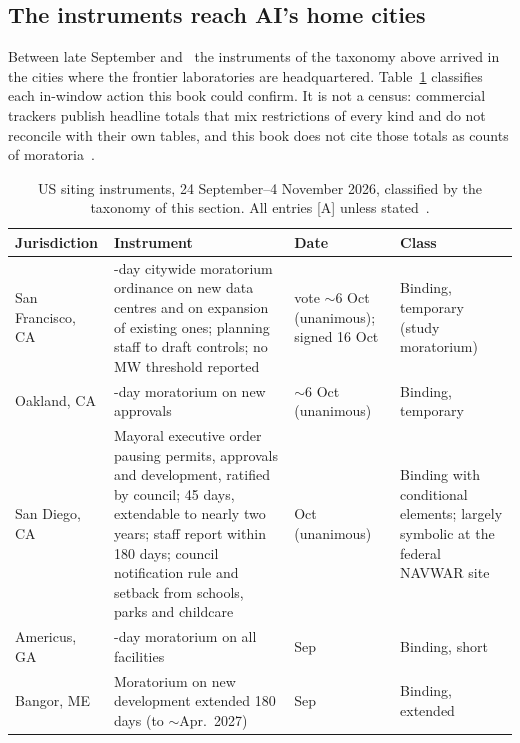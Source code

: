 \subsection{The instruments reach AI's home cities}
\label{sec:cap-home-cities}

Between late September and \datafreeze\ the instruments of the taxonomy above arrived in the cities where the frontier laboratories are headquartered. Table~\ref{tab:cap-moratoria} classifies each in-window action this book could confirm. It is not a census: commercial trackers publish headline totals that mix restrictions of every kind and do not reconcile with their own tables, and this book does not cite those totals as counts of moratoria~\cite{cap-moratoria-autumn}.

\begin{table}[htbp]
  \centering
  \scriptsize
  \setlength{\tabcolsep}{3pt}
  \caption{US siting instruments, 24 September--4 November 2026, classified by the taxonomy of this section. All entries [A] unless stated~\cite{cap-moratoria-autumn,cap-ballot-measures,cap-dc-obstacles,cap-ercot-sb6}.}
  \label{tab:cap-moratoria}
  \begin{tabular}{>{\raggedright\arraybackslash}p{24mm}>{\raggedright\arraybackslash}p{66mm}>{\raggedright\arraybackslash}p{20mm}>{\raggedright\arraybackslash}p{40mm}}
    \toprule
    Jurisdiction & Instrument & Date & Class \\
    \midrule
    San Francisco, CA & 45-day citywide moratorium ordinance on new data centres and on expansion of existing ones; planning staff to draft controls; no MW threshold reported & vote $\sim$6 Oct (unanimous); signed 16 Oct & Binding, temporary (study moratorium) \\
    Oakland, CA & 45-day moratorium on new approvals & $\sim$6 Oct (unanimous) & Binding, temporary \\
    San Diego, CA & Mayoral executive order pausing permits, approvals and development, ratified by council; 45 days, extendable to nearly two years; staff report within 180 days; council notification rule and setback from schools, parks and childcare & 27 Oct (unanimous) & Binding with conditional elements; largely symbolic at the federal NAVWAR site \\
    Americus, GA & 30-day moratorium on all facilities & 24 Sep & Binding, short \\
    Bangor, ME & Moratorium on new development extended 180 days (to $\sim$Apr.\ 2027) & 29 Sep & Binding, extended \\

\end{tabular}
\end{table}
